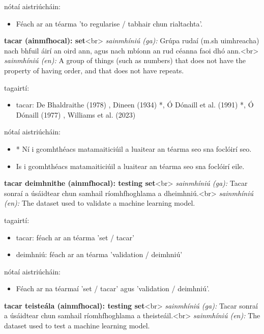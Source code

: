 \documentclass{article}
\begin{document}
nótaí aistriúcháin:
\begin{itemize}
	\item Féach ar an téarma 'to regularise / tabhair chun rialtachta'.
\end{itemize}


\textbf{tacar (ainmfhocal): set}<br>
\textit{sainmhíniú (ga):} Grúpa rudaí (m.sh uimhreacha) nach bhfuil áirí an oird ann, agus nach mbíonn an rud céanna faoi dhó ann.<br>
\textit{sainmhíniú (en):} A group of things (such as numbers) that does not have the property of having order, and that does not have repeats.

tagairtí:
\begin{itemize}
	\item tacar: De Bhaldraithe (1978) \cite{de-bhaldraithe}, Dineen (1934) \cite{dineen}*, Ó Dónaill et al. (1991) \cite{focloir-beag}*, Ó Dónaill (1977) \cite{odonaill}, Williams et al. (2023) \cite{storchiste}
\end{itemize}

nótaí aistriúcháin:
\begin{itemize}
	\item * Ní i gcomhthéacs matamaiticiúil a luaitear an téarma seo sna foclóirí seo.
	\item Is i gcomhthéacs matamaiticiúil a luaitear an téarma seo sna foclóirí eile.
\end{itemize}


\textbf{tacar deimhnithe (ainmfhocal): testing set}<br>
\textit{sainmhíniú (ga):} Tacar sonraí a úsáidtear chun samhail ríomhfhoghlama a dheimhniú.<br>
\textit{sainmhíniú (en):} The dataset used to validate a machine learning model.

tagairtí:
\begin{itemize}
	\item tacar: féach ar an téarma 'set / tacar'
	\item deimhniú: féach ar an téarma 'validation / deimhniú'
\end{itemize}

nótaí aistriúcháin:
\begin{itemize}
	\item Féach ar na téarmaí 'set / tacar' agus 'validation / deimhniú'.
\end{itemize}


\textbf{tacar teisteála (ainmfhocal): testing set}<br>
\textit{sainmhíniú (ga):} Tacar sonraí a úsáidtear chun samhail ríomhfhoghlama a theisteáil.<br>
\textit{sainmhíniú (en):} The dataset used to test a machine learning model.
\end{document}
